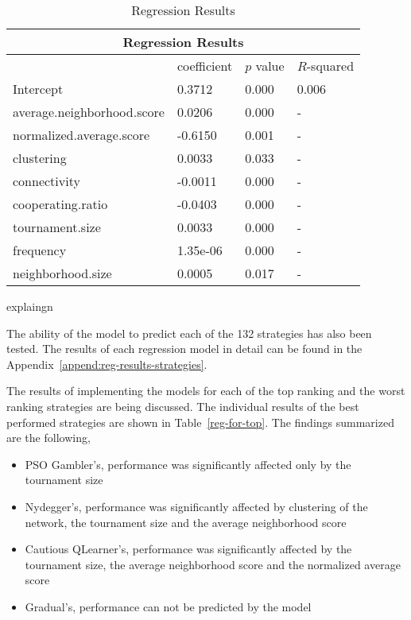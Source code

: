 \begin{table}[!hbtp]
	\centering
	\begin{adjustbox}{width=0.7\textwidth}
		\small
		\begin{tabular}{|l|l|l|l|}
			\hline
			\multicolumn{4}{|c|}{Regression Results}         \\ \hline
			                           & coefficient & \(p\) value & \(R\)-squared \\ \hline
			Intercept                  & 0.3712      & 0.000       & 0.006     \\ \hline
			average.neighborhood.score & 0.0206      & 0.000       & -         \\ \hline
			normalized.average.score   & -0.6150     & 0.001       & -         \\ \hline
			clustering                 & 0.0033      & 0.033       & -         \\ \hline
			connectivity               & -0.0011     & 0.000       & -         \\ \hline
			cooperating.ratio          & -0.0403     & 0.000       & -         \\ \hline
			tournament.size            & 0.0033      & 0.000       & -         \\ \hline
			frequency                  & 1.35e-06    & 0.000       & -         \\ \hline
			neighborhood.size          & 0.0005      & 0.017       & -         \\ \hline

		\end{tabular}
	\end{adjustbox}
	\caption{Regression Results}
	\label{regression-complex-networks}
	explaingn
\end{table}

The ability of the model to predict each of the 132 strategies has also been
tested. The results of each regression model in detail can be found in the
Appendix~\ref{append:reg-results-strategies}.

The results of implementing the models for each of the top ranking and the worst
ranking strategies are being discussed. The individual results of the best
performed strategies are shown in Table~\ref{reg-for-top}. The findings summarized
are the following,

\begin{itemize}
	\item PSO Gambler's, performance was significantly affected only by the tournament size
	\item Nydegger's, performance was significantly affected by clustering of the network,
	      the tournament size and the average neighborhood score
	\item Cautious QLearner's, performance was significantly affected by the tournament size,
	      the average neighborhood score and the normalized average score
	\item Gradual's, performance can not be predicted by the model
\end{itemize}

